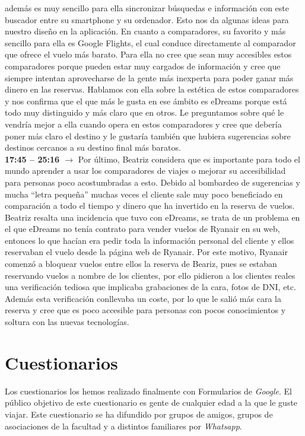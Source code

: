 además es muy sencillo para ella sincronizar búsquedas e información con este buscador entre su smartphone y su ordenador. Esto nos da algunas ideas para nuestro diseño en la 
aplicación. En cuanto a comparadores, su favorito y más sencillo para ella es Google Flights, el cual conduce directamente al comparador que ofrece el vuelo más barato. Para ella
no cree que sean muy accesibles estos comparadores porque pueden estar muy cargados de información y cree que siempre intentan aprovecharse de la gente más inexperta para poder
ganar más dinero en las reservas. Hablamos con ella sobre la estética de estos comparadores y nos confirma que el que más le gusta en ese ámbito es eDreams porque está todo muy 
distinguido y más claro que en otros. Le preguntamos sobre qué le vendría mejor a ella cuando opera en estos comparadores y cree que debería poner más claro el destino y le 
gustaría también que hubiera sugerencias sobre destinos cercanos a su destino final más baratos. \\
\textbf{17:45 -- 25:16 $\rightarrow$} Por último, Beatriz considera que es importante para todo el mundo aprender a usar los comparadores de viajes o mejorar su accesibilidad 
para personas poco acostumbradas a esto. Debido al bombardeo de sugerencias y mucha “letra pequeña” muchas veces el cliente sale muy poco beneficiado en comparación a todo el 
tiempo y dinero que ha invertido en la reserva de vuelos. Beatriz resalta una incidencia que tuvo con eDreams, se trata de un problema en el que eDreams no tenía contrato para 
vender vuelos de Ryanair en su web, entonces lo que hacían era pedir toda la información personal del cliente y ellos reservaban el vuelo desde la página web de Ryanair. Por 
este motivo, Ryanair comenzó a bloquear vuelos entre ellos la reserva de Beariz, pues se estaban reservando vuelos a nombre de los clientes, por ello pidieron a los clientes 
reales una verificación tediosa que implicaba grabaciones de la cara, fotos de DNI, etc. Además esta verificación conllevaba un coste, por lo que le salió más cara la reserva 
y cree que es poco accesible para personas con pocos conocimientos y soltura con las nuevas tecnologías.
\section{Cuestionarios}

Los cuestionarios los hemos realizado finalmente con Formularios de \textit{Google}. El público objetivo de este cuestionario es gente de cualquier edad a la que le guste viajar. Este cuestionario se ha difundido por grupos de amigos, grupos de asociaciones de la facultad y a distintos familiares por \textit{Whatsapp}.

